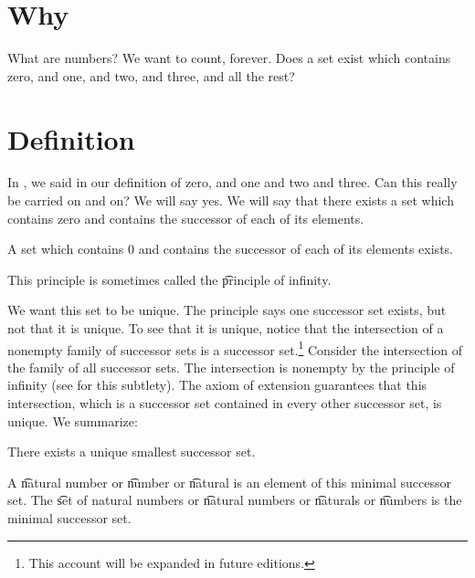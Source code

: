 

\section*{Why}

What are numbers?
We want to count, forever.
Does a set exist which contains zero, and one, and two, and three, and all the rest?

\section*{Definition}

In , we said  in our definition of zero, and one and two and three.
Can this really be carried on and on?
We will say yes.
We will say that there exists a set which contains zero and contains the successor of each of its elements.

\begin{principle}
A set which contains 0 and contains the successor of each of its elements exists.\end{principle}
This principle is sometimes called the \t{principle of infinity}.

We want this set to be unique.
The principle says one successor set exists, but not that it is unique.
To see that it is unique, notice that the intersection of a nonempty family of successor sets is a successor set.\footnote{This account will be expanded in future editions.}
Consider the intersection of the family of all successor sets.
The intersection is nonempty by the principle of infinity (see for this subtlety).
The axiom of extension guarantees that this intersection, which is a successor set contained in every other successor set, is unique.
We summarize:

\begin{proposition}

\label{natural_numbers:proposition:omega}There exists a unique smallest successor set.\end{proposition}
A \t{natural number} or \t{number} or \t{natural} is an element of this minimal successor set.
The \t{set of natural numbers} or \t{natural numbers} or \t{naturals} or \t{numbers} is the minimal successor set.

